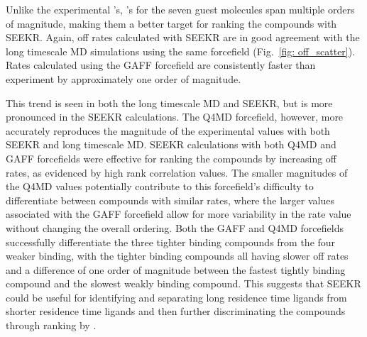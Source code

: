 
 





\par Unlike the experimental \kon's, \koff's for the seven guest 
molecules span multiple orders of magnitude, making them a better target for 
ranking the compounds with SEEKR.
Again, off rates calculated with SEEKR are in good agreement with the long 
timescale MD simulations using the same forcefield (Fig.~\ref{fig: off_scatter}). Rates calculated using the 
GAFF forcefield are consistently faster than experiment by approximately one 
order of magnitude. 

This trend is seen in both the long timescale MD and SEEKR, 
but is more pronounced in the SEEKR calculations. The Q4MD forcefield, however, 
more accurately reproduces the magnitude of the experimental values with both 
SEEKR and long timescale MD. SEEKR calculations with both Q4MD and GAFF 
forcefields were effective for ranking the compounds by increasing off rates, as evidenced by high rank correlation values.
The smaller magnitudes of the Q4MD 
values potentially contribute to this forcefield's difficulty to differentiate 
between compounds with similar rates, where the larger values associated with 
the GAFF forcefield allow for more variability in the rate value without changing 
the overall ordering. Both the GAFF and Q4MD forcefields successfully differentiate 
the three tighter binding compounds from the four weaker binding, with the tighter binding compounds 
all having slower off rates and a difference of one order of magnitude between 
the fastest tightly binding compound and the slowest weakly binding compound. This suggests that SEEKR 
could be useful for identifying and separating long residence time ligands from 
shorter residence time ligands and then further discriminating the compounds 
through ranking by \koff.


